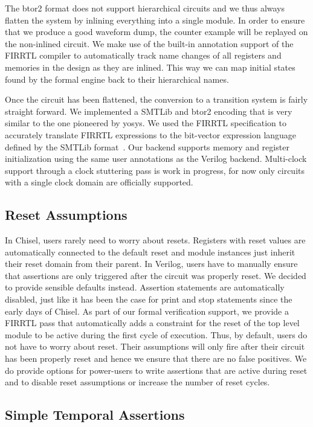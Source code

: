 \documentclass[conference]{IEEEtran}
\begin{document}
The btor2 format does not support hierarchical circuits and we thus always flatten the system by inlining everything into a single module.
In order to ensure that we produce a good waveform dump, the counter example will be replayed on the non-inlined circuit.
We make use of the built-in annotation support of the FIRRTL compiler to automatically track name changes of all registers and memories in
the design as they are inlined. This way we can map initial states found by the formal engine back to their hierarchical names.

Once the circuit has been flattened, the conversion to a transition system is fairly straight forward.
We implemented a SMTLib and btor2 encoding that is very similar to the one pioneered by yosys.
We used the FIRRTL specification to accurately translate FIRRTL expressions to the bit-vector expression language defined by the SMTLib format~\cite{smtlib}.
Our backend supports memory and register initialization using the same user annotations as the Verilog backend.
Multi-clock support through a clock stuttering pass is work in progress, for now only circuits with a single clock domain are officially supported.

\subsection{Reset Assumptions}\label{sec:reset}

In Chisel, users rarely need to worry about resets.
Registers with reset values are automatically connected to the default reset %
and module instances just inherit their reset domain from their parent.
In Verilog, users have to manually ensure that assertions are only triggered after the circuit was properly reset.
We decided to provide sensible defaults instead.
Assertion statements are automatically disabled, just like it has been the case for print and stop statements
since the early days of Chisel.
As part of our formal verification support, we provide a FIRRTL pass
that automatically adds a constraint for the reset of the top level module to be active during the first cycle of execution.
Thus, by default, users do not have to worry about reset. Their assumptions will only fire
after their circuit has been properly reset and hence we ensure that there are no false positives.
We do provide options for power-users to write assertions that are active during reset and to
disable reset assumptions or increase the number of reset cycles.


\subsection{Simple Temporal Assertions}\label{sec:past}
\end{document}
